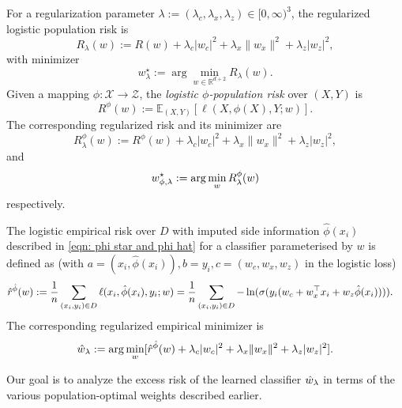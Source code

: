 For a regularization parameter $ \lambda := (\lambda_c, \lambda_x, \lambda_z) \in [0,\infty)^{3} $, the regularized logistic population risk is
\begin{equation*}
    R_\lambda(w) := R(w) + \lambda_c |w_c|^2 + \lambda_x \lVert w_x \rVert^2 + \lambda_z |w_z|^2,
\end{equation*}
with minimizer
\begin{equation}\label{eqn: w lambda star}
    w^\star_\lambda := \arg\min_{w \in \mathbb{R}^{d+2}} R_\lambda(w).
\end{equation}
Given a mapping $ \phi: \mathcal{X} \rightarrow \mathcal{Z} $, the \textit{logistic $\phi$-population risk} over $ (X,Y) $ is
\begin{equation*}
    R^\phi(w) := \mathbb{E}_{(X, Y)}[\ell(X,\phi(X),Y; w)].
\end{equation*}
The corresponding regularized risk and its minimizer are
\begin{equation*}\label{eqn: risk phi eta}
    R^\phi_\lambda(w) := R^\phi(w) + \lambda_c |w_c|^2 + \lambda_x \lVert w_x \rVert^2 + \lambda_z |w_z|^2,
\end{equation*}
and
\begin{equation}\label{eqn: w star phi lambda}
   w^\star_{\phi,\lambda} := \arg\min_w R^{\phi}_\lambda(w)
\end{equation}
respectively.

\noindent The logistic empirical risk over $ D $ with imputed side information $ \hat{\phi}(x_i) $ described in \eqref{eqn: phi star and phi hat} for a classifier parameterised by $w$ is defined as (with $a = (x_i,\hat{\phi}(x_i)), b= y_i, c = (w_c, w_x, w_z)$ in the logistic loss)
\begin{equation*}
\begin{aligned}
    \hat{r}^{\hat{\phi}}(w) &:= \frac{1}{n} \sum_{(x_i, y_i) \in D} \ell(x_i, \hat{\phi}(x_i), y_i; w) = \frac{1}{n} \sum_{(x_i, y_i) \in D} -\ln(\sigma(y_i(w_c + w_x^\top x_i + w_z \hat{\phi}(x_i)))).
\end{aligned}
\end{equation*}
The corresponding regularized empirical minimizer is
\begin{equation}\label{eqn: w hat lambda}
    \hat{w}_\lambda := \arg\min_w [ \hat{r}^{\hat{\phi}}(w) + \lambda_c |w_c|^2 + \lambda_x \lVert w_x \rVert^2 + \lambda_z |w_z|^2 ].
\end{equation}

Our goal is to analyze the excess risk of the learned classifier $\hat{w}_\lambda$ in terms of the various population-optimal weights described earlier.


